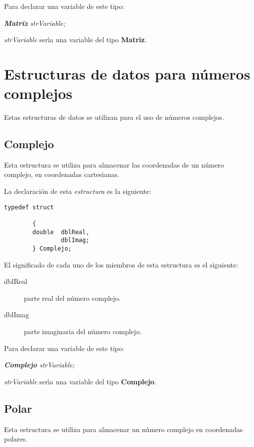 Para declarar una variable de este tipo:

\begin{center}
\emph{\textbf{Matriz} strVariable;}
\end{center}

\emph{strVariable} ser\'{\i}a una variable del tipo \textbf{Matriz}.

\section{Estructuras de datos para n\'umeros complejos} \label{sec:complejos}

Estas estructuras de datos se utilizan para el uso de n\'umeros complejos.

\subsection{Complejo}
Esta estructura se utiliza para almacenar las coordenadas de un n\'umero
complejo, en coordenadas cartesianas.\newline

La declaraci\'on de esta \emph{estructura} es la siguiente:

\begin{verbatim}
typedef struct

        {
        double  dblReal,
                dblImag;
        } Complejo;
\end{verbatim}

El significado de cada uno de los miembros de esta estructura es el siguiente:

\begin{description}
\item[dblReal] parte real del n\'umero complejo.
\item[dblImag] parte imaginaria del n\'umero complejo.
\end{description}

Para declarar una variable de este tipo:

\begin{center}
\emph{\textbf{Complejo} strVariable;}
\end{center}

\emph{strVariable} ser\'{\i}a una variable del tipo \textbf{Complejo}.

\newpage

\subsection{Polar}
Esta estructura se utiliza para almacenar un n\'umero complejo en 
coordenadas polares.\newline

